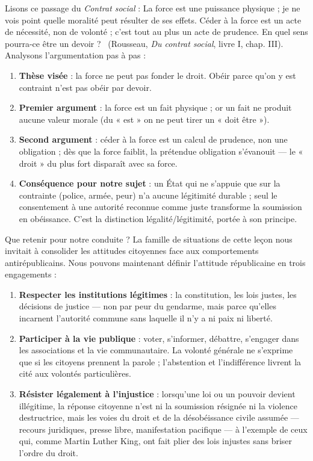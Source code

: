 \documentclass[11pt]{article}
\newcommand{\cle}[1]{{\popxbold\color{popdark}#1}}
\newcounter{popsec}
\newcounter{popsub}
\newcommand{\courssub}[1]{%
  \stepcounter{popsub}%
  \par\vspace{9pt}\noindent{\popxbold\fontsize{11.5}{13}\selectfont\color{popink}{\color{poporange}\thepopsec.\thepopsub}\hspace{6pt}#1}\par\nopagebreak\vspace{4pt}
}
\begin{document}
\begin{experience}
Lisons ce passage du \emph{Contrat social} : \guillemotleft La force est une puissance physique ; je ne vois point quelle moralité peut résulter de ses effets. Céder à la force est un acte de nécessité, non de volonté ; c'est tout au plus un acte de prudence. En quel sens pourra-ce être un devoir ? \guillemotright\ (Rousseau, \emph{Du contrat social}, livre I, chap. III). Analysons l'argumentation pas à pas :
\begin{enumerate}
\item \textbf{Thèse visée} : la force ne peut pas fonder le droit. Obéir parce qu'on y est contraint n'est pas obéir par devoir.
\item \textbf{Premier argument} : la force est un fait physique ; or un fait ne produit aucune valeur morale (du « est » on ne peut tirer un « doit être »).
\item \textbf{Second argument} : céder à la force est un calcul de prudence, non une obligation ; dès que la force faiblit, la prétendue obligation s'évanouit — le « droit » du plus fort disparaît avec sa force.
\item \textbf{Conséquence pour notre sujet} : un État qui ne s'appuie que sur la contrainte (police, armée, peur) n'a aucune légitimité durable ; seul le consentement à une autorité reconnue comme juste transforme la soumission en obéissance. C'est la distinction légalité/légitimité, portée à son principe.
\end{enumerate}
\end{experience}

\courssub{Conclusion citoyenne : l'attitude républicaine}

Que retenir pour notre conduite ? La famille de situations de cette leçon nous invitait à consolider les attitudes citoyennes face aux comportements antirépublicains. Nous pouvons maintenant définir l'\cle{attitude républicaine} en trois engagements :

\begin{enumerate}
\item \textbf{Respecter les institutions légitimes} : la constitution, les lois justes, les décisions de justice — non par peur du gendarme, mais parce qu'elles incarnent l'autorité commune sans laquelle il n'y a ni paix ni liberté.
\item \textbf{Participer à la vie publique} : voter, s'informer, débattre, s'engager dans les associations et la vie communautaire. La volonté générale ne s'exprime que si les citoyens prennent la parole ; l'abstention et l'indifférence livrent la cité aux volontés particulières.
\item \textbf{Résister légalement à l'injustice} : lorsqu'une loi ou un pouvoir devient illégitime, la réponse citoyenne n'est ni la soumission résignée ni la violence destructrice, mais les voies du droit et de la désobéissance civile assumée — recours juridiques, presse libre, manifestation pacifique — à l'exemple de ceux qui, comme Martin Luther King, ont fait plier des lois injustes sans briser l'ordre du droit.
\end{enumerate}
\end{document}

